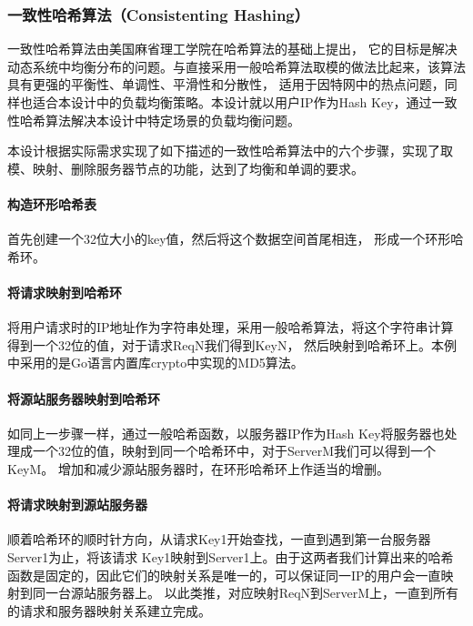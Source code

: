 \documentclass[twoside]{CUGThesis}
\begin{document}
	\subsubsection{一致性哈希算法（Consistenting Hashing）}
	一致性哈希算法由美国麻省理工学院在哈希算法的基础上提出\cite{karger1997consistent}，
	它的目标是解决动态系统中均衡分布的问题。与直接采用一般哈希算法取模的做法比起来，该算法具有更强的平衡性、单调性、平滑性和分散性，
	适用于因特网中的热点问题，同样也适合本设计中的负载均衡策略。本设计就以用户IP作为Hash Key，通过一致性哈希算法解决本设计中特定场景的负载均衡问题。\par 
	本设计根据实际需求实现了如下描述的一致性哈希算法中的六个步骤，实现了取模、映射、删除服务器节点的功能，达到了均衡和单调的要求。\par
	\paragraph{构造环形哈希表}
	首先创建一个32位大小的key值，然后将这个数据空间首尾相连，
	形成一个环形哈希环。
	\paragraph{将请求映射到哈希环}
	将用户请求时的IP地址作为字符串处理，采用一般哈希算法，将这个字符串计算得到一个32位的值，对于请求ReqN我们得到KeyN，
	然后映射到哈希环上。本例中采用的是Go语言内置库crypto中实现的MD5算法。
	\paragraph{将源站服务器映射到哈希环}
	如同上一步骤一样，通过一般哈希函数，以服务器IP作为Hash Key将服务器也处理成一个32位的值，映射到同一个哈希环中，对于ServerM我们可以得到一个KeyM。
	增加和减少源站服务器时，在环形哈希环上作适当的增删。
	\paragraph{将请求映射到源站服务器}
	顺着哈希环的顺时针方向，从请求Key1开始查找，一直到遇到第一台服务器Server1为止，将该请求
	Key1映射到Server1上。由于这两者我们计算出来的哈希函数是固定的，因此它们的映射关系是唯一的，可以保证同一IP的用户会一直映射到同一台源站服务器上。
	以此类推，对应映射ReqN到ServerM上，一直到所有的请求和服务器映射关系建立完成。
\end{document}

